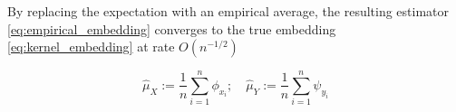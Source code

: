 \documentclass[twoside]{article} \usepackage{aistats2017}
\theoremstyle{definition}
\theoremstyle{theorem}
\newcommand{\rv}[1]{{#1}}
\newcommand{\inner}[2]{{\langle #1, #2 \rangle}}
\newcommand{\hatmuX}{\hat{\mu}_{\rv{X}}}
\newcommand{\hatmuY}{\hat{\mu}_{\rv{Y}}}
\begin{document}
			By replacing the expectation with an empirical average, the resulting estimator \eqref{eq:empirical_embedding} converges to the true embedding \eqref{eq:kernel_embedding} at rate $O(n^{-1/2})$ \citep{smola2007hilbert}

			\begin{equation}
				\hatmuX := \frac{1}{n} \sum_{i = 1}^{n} \phi_{x_{i}} ;\quad \hatmuY := \frac{1}{n} \sum_{i = 1}^{n} \psi_{y_{i}}
			\label{eq:empirical_embedding}
			\end{equation}

%
\end{document}
